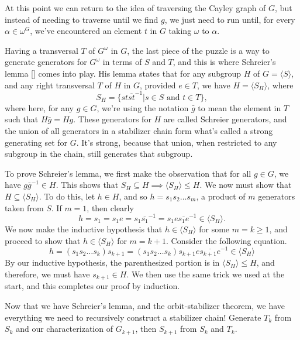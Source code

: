 \documentclass[12pt]{article}
\begin{document}
At this point we can return to the idea of traversing the Cayley graph of $G$,
but instead of needing to traverse until we find $g$, we just need to run until,
for every $\alpha\in\omega^G$,
we've encountered an element $t$ in $G$ taking $\omega$ to $\alpha$.

Having a transversal $T$ of $G^\omega$ in $G$, the last piece of the
puzzle is a way to generate generators for $G^\omega$ in terms
of $S$ and $T$, and this is where Schreier's lemma \ref{} comes into play.
His lemma states that for any subgroup $H$ of $G=\langle S\rangle$, and
any right transversal $T$ of $H$ in $G$, provided $e\in T$, we have $H=\langle S_H\rangle$, where
\begin{equation*}
S_H = \{st\overline{st}^{-1}|\mbox{$s\in S$ and $t\in T$}\},
\end{equation*}
where here, for any $g\in G$, we're using the notation $\bar{g}$ to
mean the element in $T$ such that $H\bar{g}=H g$.
These generators for $H$ are called Schreier generators, and the union of all generators in
a stabilizer chain form what's called a strong generating set for $G$.
It's strong, because that union, when restricted to any subgroup in
the chain, still generates that subgroup.

To prove Schreier's lemma, we first make the observation that for all $g\in G$,
we have $g\bar{g}^{-1}\in H$.  This shows that $S_H\subseteq H\implies \langle S_H\rangle\leq H$.
We now must show that $H\subseteq\langle S_H\rangle$.  To do this, let $h\in H$, and so
$h=s_1s_2\dots s_m$, a product of $m$ generators taken from $S$.  If $m=1$,
then clearly
\begin{equation*}
h=s_1=s_1e=s_1\overline{s_1}^{-1}=s_1e\overline{s_1e}^{-1}\in\langle S_H\rangle.
\end{equation*}
We now make the inductive hypothesis that $h\in\langle S_H\rangle$ for some $m=k\geq 1$,
and proceed to show that $h\in\langle S_H\rangle$ for $m=k+1$.  Consider the following equation.
\begin{equation*}
h = (s_1s_2\dots s_k)s_{k+1} = (s_1s_2\dots s_k)s_{k+1}e\overline{s_{k+1}e}^{-1}\in\langle S_H\rangle
\end{equation*}
By our inductive hypothesis, the parenthesized portion is in $\langle S_H\rangle\leq H$,
and therefore, we must have $s_{k+1}\in H$.  We then use the same trick we used
at the start, and this completes our proof by induction.

Now that we have Schreier's lemma, and the orbit-stabilizer theorem, we have everything
we need to recursively construct a stabilizer chain!  Generate $T_k$ from
$S_k$ and our characterization of $G_{k+1}$, then $S_{k+1}$ from $S_k$ and $T_k$.
\end{document}
